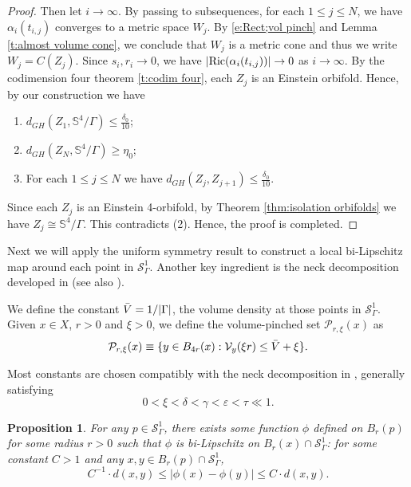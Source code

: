 \documentclass[11pt,reqno]{amsart}
\numberwithin{equation}{section}
\newcommand{\Ric}{{\rm Ric}}
\newcommand{\cP}{\mathcal{P}}
\newcommand{\cS}{\mathcal{S}}
\newcommand{\cV}{\mathcal{V}}
\newtheorem{proposition}[thm]{Proposition}
\theoremstyle{definition}
\theoremstyle{remark}
\begin{document}
\begin{proof}
Then let $i \to \infty$. By passing to subsequences, for each $1\leqslant j \leqslant N$, we have $\alpha_i(t_{i,j})$ converges to a metric space $W_j$. By \eqref{e:Rect;vol pinch} and Lemma \ref{t:almost volume cone}, we conclude that $W_j$ is a metric cone and thus we write $W_j= C(Z_j)$. Since $s_i, r_i \to 0$, we have $|\Ric(\alpha_i(t_{i,j}))| \to 0$ as $i \to \infty$. By the codimension four theorem \ref{t:codim four}, each $Z_j$ is an Einstein orbifold. Hence, by our construction we have
\begin{enumerate}
        \item $d_{GH}(Z_1, \mathbb{S}^4/\Gamma) \leqslant \frac{\delta_0}{10}$;
        \item $d_{GH}(Z_N,\mathbb{S}^4/\Gamma) \ge \eta_0$;
        \item For each $1\leqslant j \leqslant N$ we have $d_{GH}(Z_j, Z_{j+1}) \leqslant \frac{\delta_0}{10}$.
    \end{enumerate}

Since each $Z_j$ is an Einstein 4-orbifold, by Theorem \ref{thm:isolation orbifolds} we have $Z_j \cong \mathbb{S}^4/\Gamma$. This contradicts (2). Hence, the proof is completed.    
\end{proof}

Next we will apply the uniform symmetry result to construct a local bi-Lipschitz map around each point in $\cS^1_{\Gamma}$. Another key ingredient is the neck decomposition developed in \cite{jn,cjn} (see also \cite{nv19}).  

We define the constant $\Bar{V} = 1/|\Gamma|$, the volume density at those points in $\cS^1_{\Gamma}$. Given $x\in X$, $r>0$ and $\xi>0$, we define the volume-pinched set $\cP_{r,\xi}(x)$ as
\begin{equation*}
    \cP_{r,\xi}(x) \equiv \{ y \in B_{4r}(x) : \cV_y(\xi r) \le \Bar{V} + \xi \}.
\end{equation*}

Most constants are chosen compatibly with the neck decomposition in \cite[Section 10]{cjn}, generally satisfying
\begin{equation*}
    0<\xi < \delta < \gamma < \varepsilon < \tau \ll 1. 
\end{equation*}

\begin{proposition}\label{p:local Lipschitz}
    For any $p \in \cS^1_{\Gamma}$, there exists some function $\phi$ defined on $B_{r}(p)$ for some radius $r>0$ such that $\phi$ is bi-Lipschitz on $B_{r}(x) \cap \cS^1_{\Gamma}$: for some constant $C>1$ and any $x,y \in B_{r}(p) \cap \cS^1_{\Gamma}$,
    \begin{equation}\label{e:Recf;biLip}
        C^{-1} \cdot d(x,y) \leqslant |\phi(x) - \phi(y)| \leqslant C \cdot d(x,y).
    \end{equation}
\end{proposition}
\end{document}
